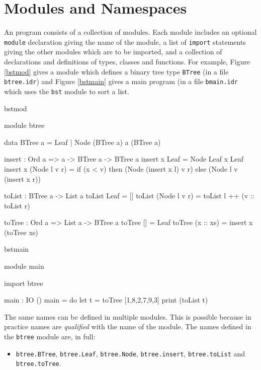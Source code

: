 \section{Modules and Namespaces}
\label{sect:namespaces}

An \Idris{} program consists of a collection of modules. Each module includes
an optional \texttt{module} declaration giving the name of the module, a
list of \texttt{import} statements giving the other modules which are to be imported,
and a collection of declarations and definitions of types, classes and functions.
For example, Figure \ref{bstmod} gives a module which defines a binary
tree type \texttt{BTree} (in a file \texttt{btree.idr}) and Figure
\ref{bstmain} gives a main program (in a file \texttt{bmain.idr} which uses the
\texttt{bst} module to sort a list.

\begin{SaveVerbatim}{bstmod}

module btree

data BTree a = Leaf
             | Node (BTree a) a (BTree a)

insert : Ord a => a -> BTree a -> BTree a
insert x Leaf = Node Leaf x Leaf
insert x (Node l v r) = if (x < v) then (Node (insert x l) v r)
                                   else (Node l v (insert x r))

toList : BTree a -> List a
toList Leaf = []
toList (Node l v r) = toList l ++ (v :: toList r)

toTree : Ord a => List a -> BTree a
toTree [] = Leaf
toTree (x :: xs) = insert x (toTree xs)

\end{SaveVerbatim}

\begin{SaveVerbatim}{bstmain}

module main

import btree

main : IO ()
main = do let t = toTree [1,8,2,7,9,3] 
          print (toList t)

\end{SaveVerbatim}

\noindent
The same names can be defined in multiple modules. This is possible because in practice names
are \emph{qualified} with the name of the module. 
The names defined in the \texttt{btree} module are, in full:

\begin{itemize}
\item \texttt{btree.BTree}, \texttt{btree.Leaf}, \texttt{btree.Node}, \texttt{btree.insert},
\texttt{btree.toList} and \texttt{btree.toTree}.
\end{itemize}

